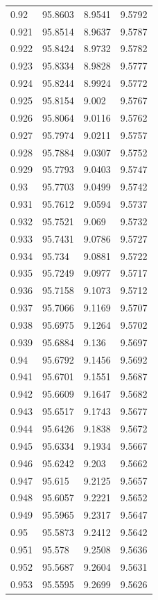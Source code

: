 \begin{tabular}{llll}
0.92 & 95.8603 & 8.9541 & 9.5792 \\
0.921 & 95.8514 & 8.9637 & 9.5787 \\
0.922 & 95.8424 & 8.9732 & 9.5782 \\
0.923 & 95.8334 & 8.9828 & 9.5777 \\
0.924 & 95.8244 & 8.9924 & 9.5772 \\
0.925 & 95.8154 & 9.002 & 9.5767 \\
0.926 & 95.8064 & 9.0116 & 9.5762 \\
0.927 & 95.7974 & 9.0211 & 9.5757 \\
0.928 & 95.7884 & 9.0307 & 9.5752 \\
0.929 & 95.7793 & 9.0403 & 9.5747 \\
0.93 & 95.7703 & 9.0499 & 9.5742 \\
0.931 & 95.7612 & 9.0594 & 9.5737 \\
0.932 & 95.7521 & 9.069 & 9.5732 \\
0.933 & 95.7431 & 9.0786 & 9.5727 \\
0.934 & 95.734 & 9.0881 & 9.5722 \\
0.935 & 95.7249 & 9.0977 & 9.5717 \\
0.936 & 95.7158 & 9.1073 & 9.5712 \\
0.937 & 95.7066 & 9.1169 & 9.5707 \\
0.938 & 95.6975 & 9.1264 & 9.5702 \\
0.939 & 95.6884 & 9.136 & 9.5697 \\
0.94 & 95.6792 & 9.1456 & 9.5692 \\
0.941 & 95.6701 & 9.1551 & 9.5687 \\
0.942 & 95.6609 & 9.1647 & 9.5682 \\
0.943 & 95.6517 & 9.1743 & 9.5677 \\
0.944 & 95.6426 & 9.1838 & 9.5672 \\
0.945 & 95.6334 & 9.1934 & 9.5667 \\
0.946 & 95.6242 & 9.203 & 9.5662 \\
0.947 & 95.615 & 9.2125 & 9.5657 \\
0.948 & 95.6057 & 9.2221 & 9.5652 \\
0.949 & 95.5965 & 9.2317 & 9.5647 \\
0.95 & 95.5873 & 9.2412 & 9.5642 \\
0.951 & 95.578 & 9.2508 & 9.5636 \\
0.952 & 95.5687 & 9.2604 & 9.5631 \\
0.953 & 95.5595 & 9.2699 & 9.5626 \\

\end{tabular}
